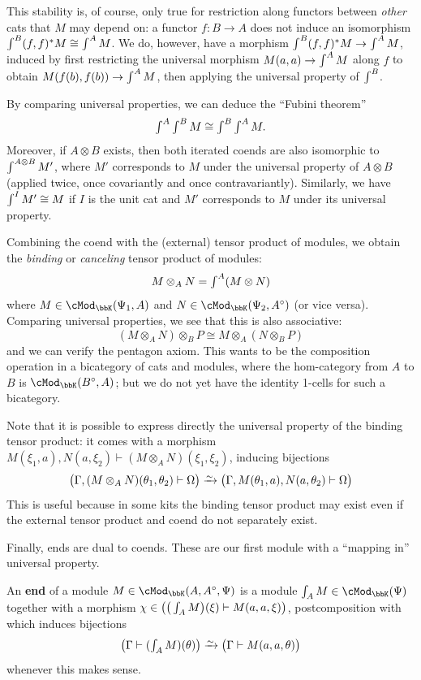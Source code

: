 \documentclass{amsart}
\newcommand{\K}{\bbK}
\let\mod\cMod
\def\modk{\mod_\K}
\renewcommand{\o}{^{\circ}}
\let\mto\vdash    %
\def\mhom#1#2{\left( #1 \vphantom{\big|}\mto #2 \right)}
\newcommand{\coend}{\begingroup\textstyle\int\endgroup}
\newcommand{\tend}{\begingroup\textstyle\int\endgroup}
\begin{document}
This stability is, of course, only true for restriction along functors between \emph{other} cats that $M$ may depend on: a functor $f:B\to A$ does not induce an isomorphism $\coend^{B} (f,f)^* M \cong \coend^A M$.
We do, however, have a morphism $\coend^{B} (f,f)^* M \to \coend^A M$, induced by first restricting the universal morphism $M(a,a) \to \coend^A M$ along $f$ to obtain $M(f(b),f(b)) \to \coend^A M$, then applying the universal property of $\coend^B$.

By comparing universal properties, we can deduce the ``Fubini theorem''
\[ \coend^A \coend^B M \cong \coend^B \coend^A M. \]
Moreover, if $A\otimes B$ exists, then both iterated coends are also isomorphic to $\coend^{A\otimes B} M'$, where $M'$ corresponds to $M$ under the universal property of $A\otimes B$ (applied twice, once covariantly and once contravariantly).
Similarly, we have $\coend^I M'\cong M$ if $I$ is the unit cat and $M'$ corresponds to $M$ under its universal property.

Combining the coend with the (external) tensor product of modules, we obtain the \emph{binding} or \emph{canceling} tensor product of modules:
\[ M\otimes_A N = \coend^A (M\otimes N) \]
where $M\in\modk(\Psi_1,A)$ and $N\in\modk(\Psi_2,A\o)$ (or vice versa).
Comparing universal properties, we see that this is also associative:
\[ (M\otimes_A N) \otimes_B P \cong M\otimes_A (N\otimes_B P) \]
and we can verify the pentagon axiom.
This wants to be the composition operation in a bicategory of cats and modules, where the hom-category from $A$ to $B$ is $\modk(B\o,A)$; but we do not yet have the identity 1-cells for such a bicategory.

Note that it is possible to express directly the universal property of the binding tensor product: it comes with a morphism $M(\xi_1,a), N(a,\xi_2) \mto (M\otimes_A N)(\xi_1,\xi_2)$, inducing bijections
\[ \mhom{\Gamma,(M\otimes_A N) (\theta_1,\theta_2)}{\Omega} \toiso \mhom{\Gamma,M(\theta_1,a),N(a,\theta_2)}{\Omega} \]
This is useful because in some kits the binding tensor product may exist even if the external tensor product and coend do not separately exist.

Finally, ends are dual to coends.
These are our first module with a ``mapping in'' universal property.

\begin{defn}
  An \textbf{end} of a module $M\in \modk(A,A\o,\Psi)$ is a module $\tend_A M\in\modk(\Psi)$ together with a morphism $\chi\in\mhom{\big(\tend_A M\big)(\xi)}{M(a,a,\xi)}$, postcomposition with which induces bijections
  \[ \mhom{\Gamma}{(\tend_A M)(\theta)} \toiso \mhom{\Gamma}{M(a,a,\theta)} \]
  whenever this makes sense.
\end{defn}
\end{document}

